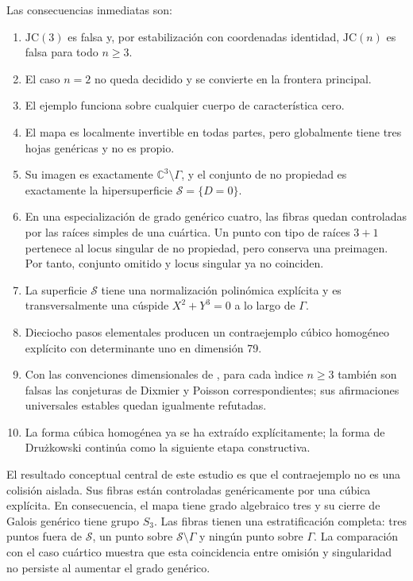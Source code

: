 \documentclass[11pt]{article}
\theoremstyle{definition}
\theoremstyle{remark}
\newcommand{\C}{\mathbb{C}}
\begin{document}
Las consecuencias inmediatas son:

\begin{enumerate}
\item $\mathrm{JC}(3)$ es falsa y, por estabilizaci\'on con coordenadas
identidad, $\mathrm{JC}(n)$ es falsa para todo $n\geq 3$.
\item El caso $n=2$ no queda decidido y se convierte en la frontera principal.
\item El ejemplo funciona sobre cualquier cuerpo de caracter\'istica cero.
\item El mapa es localmente invertible en todas partes, pero globalmente tiene
tres hojas gen\'ericas y no es propio.
\item Su imagen es exactamente $\C^3\setminus\Gamma$, y el conjunto de no
propiedad es exactamente la hipersuperficie $\mathcal S=\{D=0\}$.
\item En una especializaci\'on de grado gen\'erico cuatro, las fibras quedan
controladas por las ra\'ices simples de una cu\'artica. Un punto con tipo de
ra\'ices $3+1$ pertenece al locus singular de no propiedad, pero conserva una
preimagen. Por tanto, conjunto omitido y locus singular ya no coinciden.
\item La superficie $\mathcal S$ tiene una normalizaci\'on polin\'omica
expl\'icita y es transversalmente una c\'uspide $X^2+Y^3=0$ a lo largo de
$\Gamma$.
\item Dieciocho pasos elementales producen un contraejemplo c\'ubico
homog\'eneo expl\'icito con determinante uno en dimensi\'on 79.
\item Con las convenciones dimensionales de
\cite{AdjamagboVanDenEssen2007}, para cada \`indice $n\geq3$ tambi\'en son
falsas las conjeturas de Dixmier y Poisson correspondientes; sus afirmaciones
universales estables quedan igualmente refutadas.
\item La forma c\'ubica homog\'enea ya se ha extra\'ido expl\'icitamente; la
forma de Dru\.zkowski contin\'ua como la siguiente etapa constructiva.
\end{enumerate}

El resultado conceptual central de este estudio es que el contraejemplo no es
una colisi\'on aislada. Sus fibras est\'an controladas gen\'ericamente por una
c\'ubica expl\'icita. En consecuencia, el mapa tiene grado algebraico tres y su
cierre de Galois gen\'erico tiene grupo $S_3$.
Las fibras tienen una estratificaci\'on completa: tres puntos fuera de
$\mathcal S$, un punto sobre $\mathcal S\setminus\Gamma$ y ning\'un punto sobre
$\Gamma$. La comparaci\'on con el caso cu\'artico muestra que esta coincidencia
entre omisi\'on y singularidad no persiste al aumentar el grado gen\'erico.
\end{document}

